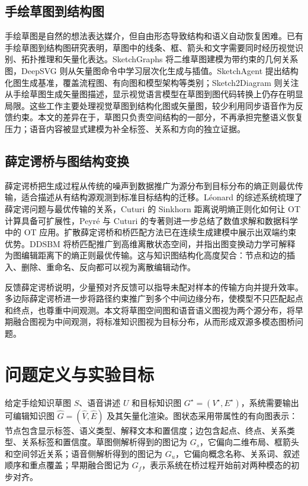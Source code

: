 \documentclass[UTF8,a4paper,12pt,fontset=fandol]{ctexart}
\begin{document}
\subsection{手绘草图到结构图}

手绘草图是自然的想法表达媒介，但自由形态导致结构和语义自动恢复困难。已有手绘草图到结构图研究表明，草图中的线条、框、箭头和文字需要同时经历视觉识别、拓扑推理和矢量化表达。SketchGraphs 将二维草图建模为带约束的几何关系图，DeepSVG 则从矢量图命令中学习层次化生成与插值\cite{seff2020sketchgraphs,carlier2020deepsvg}。SketchAgent 提出结构化图生成基准，覆盖流程图、有向图和模型架构等类别\cite{tan2025sketchagent}；Sketch2Diagram 则关注从手绘草图生成矢量图描述，显示视觉语言模型在草图到图代码转换上仍存在明显局限\cite{saito2025sketch2diagram}。这些工作主要处理视觉草图到结构化图或矢量图，较少利用同步语音作为反馈约束。本文的差异在于，草图只负责空间结构的一部分，不再承担完整语义恢复压力；语音内容被显式建模为补全标签、关系和方向的独立证据。

\subsection{薛定谔桥与图结构变换}

薛定谔桥把生成过程从传统的噪声到数据推广为源分布到目标分布的熵正则最优传输，适合描述从有结构源观测到标准目标结构的迁移。Léonard 的综述系统梳理了薛定谔问题与最优传输的关系，Cuturi 的 Sinkhorn 距离说明熵正则化如何让 OT 计算具备可扩展性，Peyré 与 Cuturi 的专著则进一步总结了数值求解和数据科学中的 OT 应用\cite{leonard2014schrodinger,cuturi2013sinkhorn,peyre2019ot}。扩散薛定谔桥和桥匹配方法已在连续生成建模中展示出双端约束优势\cite{debortoli2021dsb,shi2023dsbm}。DDSBM 将桥匹配推广到高维离散状态空间，并指出图变换动力学可解释为图编辑距离下的熵正则最优传输\cite{kim2025ddsbm}。这与知识图结构化高度契合：节点和边的插入、删除、重命名、反向都可以视为离散编辑动作。

反馈薛定谔桥说明，少量预对齐反馈可以指导未配对样本的传输方向并提升效率\cite{theodoropoulos2025fsbm}。多边际薛定谔桥进一步将路径约束推广到多个中间边缘分布，使模型不只匹配起点和终点，也尊重中间观测\cite{theodoropoulos2025mmmsbm,park2025msbm}。本文将草图空间图和语音语义图视为两个源分布，将早期融合图视为中间观测，将标准知识图视为目标分布，从而形成双源多模态图桥问题。

\section{问题定义与实验目标}

给定手绘知识草图 $S$、语音讲述 $U$ 和目标知识图 $G^\star=(V^\star,E^\star)$，系统需要输出可编辑知识图 $\hat G=(\hat V,\hat E)$ 及其矢量化渲染。图状态采用带属性的有向图表示：节点包含显示标签、语义类型、解释文本和置信度；边包含起点、终点、关系类型、关系标签和置信度。草图侧解析得到的图记为 $G_s$，它偏向二维布局、框箭头和空间邻近关系；语音侧解析得到的图记为 $G_u$，它偏向概念名称、关系词、叙述顺序和重点覆盖；早期融合图记为 $G_f$，表示系统在桥过程开始前对两种模态的初步对齐。
\end{document}
